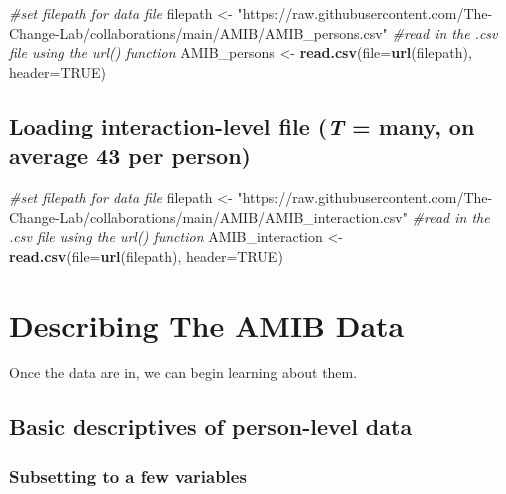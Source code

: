 \documentclass[
]{book}
\newenvironment{Shaded}{\begin{snugshade}}{\end{snugshade}}
\newcommand{\AttributeTok}[1]{\textcolor[rgb]{0.13,0.29,0.53}{#1}}
\newcommand{\CommentTok}[1]{\textcolor[rgb]{0.56,0.35,0.01}{\textit{#1}}}
\newcommand{\ConstantTok}[1]{\textcolor[rgb]{0.56,0.35,0.01}{#1}}
\newcommand{\FunctionTok}[1]{\textcolor[rgb]{0.13,0.29,0.53}{\textbf{#1}}}
\newcommand{\NormalTok}[1]{#1}
\newcommand{\OtherTok}[1]{\textcolor[rgb]{0.56,0.35,0.01}{#1}}
\newcommand{\StringTok}[1]{\textcolor[rgb]{0.31,0.60,0.02}{#1}}
\theoremstyle{definition}
\theoremstyle{definition}
\theoremstyle{definition}
\theoremstyle{definition}
\theoremstyle{remark}
\begin{document}
\begin{Shaded}
\begin{Highlighting}[]
\CommentTok{\#set filepath for data file}
\NormalTok{filepath }\OtherTok{\textless{}{-}} \StringTok{"https://raw.githubusercontent.com/The{-}Change{-}Lab/collaborations/main/AMIB/AMIB\_persons.csv"}
\CommentTok{\#read in the .csv file using the url() function}
\NormalTok{AMIB\_persons }\OtherTok{\textless{}{-}} \FunctionTok{read.csv}\NormalTok{(}\AttributeTok{file=}\FunctionTok{url}\NormalTok{(filepath), }\AttributeTok{header=}\ConstantTok{TRUE}\NormalTok{)}
\end{Highlighting}
\end{Shaded}

\subsection{\texorpdfstring{Loading interaction-level file (\emph{T} = many, on average 43 per person)}{Loading interaction-level file (T = many, on average 43 per person)}}\label{loading-interaction-level-file-t-many-on-average-43-per-person}

\begin{Shaded}
\begin{Highlighting}[]
\CommentTok{\#set filepath for data file}
\NormalTok{filepath }\OtherTok{\textless{}{-}} \StringTok{"https://raw.githubusercontent.com/The{-}Change{-}Lab/collaborations/main/AMIB/AMIB\_interaction.csv"}
\CommentTok{\#read in the .csv file using the url() function}
\NormalTok{AMIB\_interaction }\OtherTok{\textless{}{-}} \FunctionTok{read.csv}\NormalTok{(}\AttributeTok{file=}\FunctionTok{url}\NormalTok{(filepath), }\AttributeTok{header=}\ConstantTok{TRUE}\NormalTok{)}
\end{Highlighting}
\end{Shaded}

\section{Describing The AMIB Data}\label{describing-the-amib-data}

Once the data are in, we can begin learning about them.

\subsection{Basic descriptives of person-level data}\label{basic-descriptives-of-person-level-data}

\subsubsection{Subsetting to a few variables}\label{subsetting-to-a-few-variables}
\end{document}
